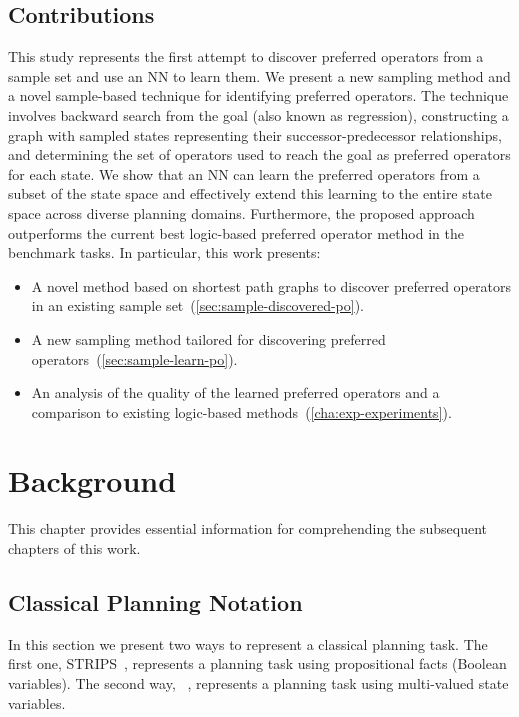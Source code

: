 \documentclass[ppgc,diss,english]{iiufrgs}
\begin{document}
\section{Contributions}
\label{sec:intro-contributions}
This study represents the first attempt to discover preferred operators from a sample set and use an NN to learn them. We present a new sampling method and a novel sample-based technique for identifying preferred operators. The technique involves backward search from the goal (also known as regression), constructing a graph with sampled states representing their successor-predecessor relationships, and determining the set of operators used to reach the goal as preferred operators for each state. We show that an NN can learn the preferred operators from a subset of the state space and effectively extend this learning to the entire state space across diverse planning domains. Furthermore, the proposed approach outperforms the current best logic-based preferred operator method in the benchmark tasks. In particular, this work presents:

\begin{itemize}
\item A novel method based on shortest path graphs to discover preferred operators in an existing sample set~(\cref{sec:sample-discovered-po}).
\item A new sampling method tailored for discovering preferred operators~(\cref{sec:sample-learn-po}).
\item An analysis of the quality of the learned preferred operators and a comparison to existing logic-based methods~(\cref{cha:exp-experiments}).
\end{itemize}
%
%
\chapter{Background}
\label{cha:background}
This chapter provides essential information for comprehending the subsequent chapters of this work.

\section{Classical Planning Notation}
\label{sec:background-planning-notation}
In this section we present two ways to represent a classical planning task. The first one, STRIPS~\cite{Fikes.Nilsson/1971}, represents a planning task using propositional facts (Boolean variables). The second way, \sas~\cite{Backstrom.Nebel/1995}, represents a planning task using multi-valued state variables. %
\end{document}

